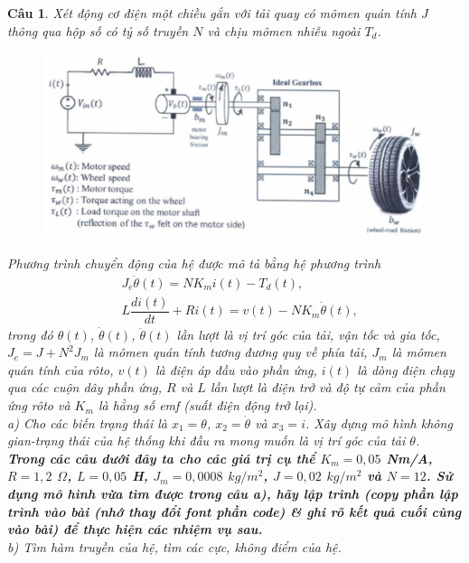 \documentclass[11pt]{article}
\newtheorem{bt}{Câu}
\begin{document}
\begin{bt} 
Xét động cơ điện một chiều gắn với tải quay có mômen quán tính $J$ thông qua hộp số có tỷ số truyền $N$ và chịu mômen nhiễu ngoài $T_d$. 

\begin{figure}[h!]
	\centering
	\includegraphics[width=0.7\linewidth]{dcmotor}
	\caption{}
	\label{fig:dcmotor}
\end{figure}

Phương trình chuyển động của hệ được mô tả bằng 
hệ phương trình
%
\begin{align}
& J_e \ddot{\theta}(t) = N K_m i(t) - T_d(t), \\
& L \dfrac{di(t)}{dt} + R i(t) = v(t) - N K_m \dot{\theta}(t),
\end{align}
%
trong đó $\theta(t)$, $\dot{\theta}(t)$, $\ddot{\theta}(t)$ lần lượt là vị trí góc của tải, vận tốc và gia tốc, $J_e = J + N^2 J_m$ là mômen quán tính tương đương quy về phía tải, $J_m$ là mômen quán tính của rôto, $v(t)$ là điện áp đầu vào phần ứng, $i(t)$ là dòng điện chạy qua các cuộn dây phần ứng, $R$ và $L$ lần lượt là điện trở và độ tự cảm của phần ứng rôto và $K_m$ là hằng số emf (suất điện động trở lại).\\

a) Cho các biến trạng thái là $x_1 = \theta$, $x_2 = \dot{\theta}$ và $x_3=i$. Xây dựng mô hình không gian-trạng thái của hệ thống khi đầu ra mong muốn là vị trí góc của tải $\theta$. \\

\textbf{Trong các câu dưới đây ta cho các giá trị cụ thể  $K_m = 0,05$ Nm/A, $R = 1,2$ $\Omega$, $L = 0,05$ H,  $J_m = 0,0008$ $kg/m^2$, $J = 0,02$ $kg/m^2$ và $N = 12$. Sử dụng mô hình vừa tìm được trong câu a), hãy lập trình (copy phần lập trình vào bài (nhớ thay đổi font phần code) \& ghi rõ kết quả cuối cùng vào bài) để thực hiện các nhiệm vụ sau.} \\

b) Tìm hàm truyền của hệ, tìm các cực, không điểm của hệ. \\


\end{bt}
\end{document}
